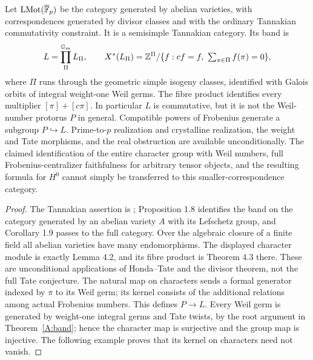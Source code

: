 \begin{proposition}
\label{A:lefschetz}
Let $\operatorname{LMot}(\overline{\mathbb F}_p)$ be the category generated
by abelian varieties, with correspondences generated by divisor
classes and with the ordinary Tannakian commutativity constraint.
It is a semisimple Tannakian category. Its band is
\[
 L=\mathop{\prod}_{\Pi}^{{\mathbb G_m}} L_\Pi,\qquad
 X^*(L_\Pi)=\mathbb Z^{\Pi}/
 \{f:c f=f,\ \textstyle\sum_{\pi\in\Pi}f(\pi)=0\},
\]
where $\Pi$ runs through the geometric simple isogeny classes,
identified with Galois orbits of integral weight-one Weil germs.
The fibre product identifies every multiplier
$[\pi]+[c\pi]$. In particular $L$ is commutative, but it is
not the Weil-number protorus $P$ in general. Compatible powers of Frobenius generate
a subgroup $P\hookrightarrow L$. Prime-to-$p$ realization and
crystalline realization, the weight and Tate morphisms, and the
real obstruction are available unconditionally. The claimed
identification of the entire character group with Weil numbers,
full Frobenius-centralizer faithfulness for arbitrary tensor
objects, and the resulting formula for $H^0$ cannot simply be
transferred to this smaller-correspondence category.
\end{proposition}
\begin{proof}
The Tannakian assertion is \citet[Theorem 1.7]{AMilne1999};
Proposition 1.8 identifies the band on the category generated by
an abelian variety $A$ with its Lefschetz group, and Corollary 1.9
passes to the full category. Over the algebraic closure of a finite
field all abelian varieties have many endomorphisms. The displayed
character module is exactly Lemma 4.2, and its fibre product is
Theorem 4.3 there. These are unconditional applications of
Honda--Tate and the divisor theorem, not the full Tate conjecture.
The natural map on characters sends a formal generator indexed by
$\pi$ to its Weil germ; its kernel consists of the additional
relations among actual Frobenius numbers. This defines $P\to L$.
Every Weil germ is generated by weight-one integral germs and
Tate twists, by the root argument in Theorem~\ref{A:band}; hence
the character map is surjective and the group map is injective.
The following example proves that its kernel on characters need
not vanish.
\end{proof}

